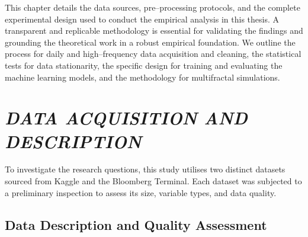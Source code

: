 \documentclass[12pt,a4paper]{report}
\numberwithin{equation}{section}
\begin{document}
This chapter details the data sources, pre--processing protocols, and the
complete experimental design used to conduct the empirical analysis in
this thesis. A transparent and replicable methodology is essential for
validating the findings and grounding the theoretical work in a robust
empirical foundation. We outline the process for daily and
high--frequency data acquisition and cleaning, the statistical tests for
data stationarity, the specific design for training and evaluating the
machine learning models, and the methodology for multifractal
simulations.

\hypertarget{smoothing--and--transforming--data}{%
\section{\texorpdfstring{\emph{\textbf{DATA ACQUISITION AND DESCRIPTION}}
}{DATA ACQUISITION AND DESCRIPTION }}\label{smoothing--and--transforming--data}}

To investigate the research questions, this study utilises two distinct datasets sourced from Kaggle and the Bloomberg Terminal. Each dataset was subjected to a preliminary inspection to assess its size, variable types, and data quality.

\hypertarget{daily--vix--index--data}{%
\subsection{Data Description and Quality Assessment}\label{daily--vix--index--data}}
\end{document}
